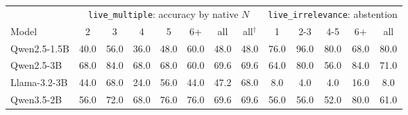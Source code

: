 \begin{tabular}{lccccccc|ccccc}
\toprule
 & \multicolumn{7}{c|}{\texttt{live\_multiple}: accuracy by native $N$} & \multicolumn{5}{c}{\texttt{live\_irrelevance}: abstention} \\
Model & 2 & 3 & 4 & 5 & 6+ & all & all$^\dagger$ & 1 & 2-3 & 4-5 & 6+ & all \\
\midrule
Qwen2.5-1.5B & 40.0 & 56.0 & 36.0 & 48.0 & 60.0 & 48.0 & 48.0 & 76.0 & 96.0 & 80.0 & 68.0 & 80.0 \\
Qwen2.5-3B & 68.0 & 84.0 & 68.0 & 68.0 & 60.0 & 69.6 & 69.6 & 64.0 & 80.0 & 56.0 & 84.0 & 71.0 \\
Llama-3.2-3B & 44.0 & 68.0 & 24.0 & 56.0 & 44.0 & 47.2 & 68.0 & 8.0 & 4.0 & 4.0 & 16.0 & 8.0 \\
Qwen3.5-2B & 56.0 & 72.0 & 68.0 & 76.0 & 76.0 & 69.6 & 69.6 & 56.0 & 56.0 & 52.0 & 80.0 & 61.0 \\
\bottomrule
\end{tabular}